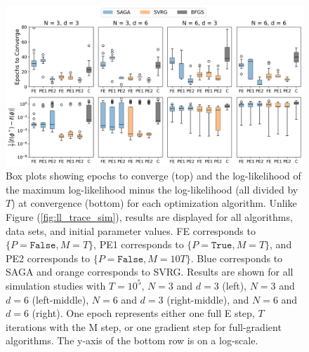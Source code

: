 %
\begin{figure}[h]
    \centering
    \includegraphics[width=6in]{../plt/boxplots_sim_T_100000.png}
    \caption{Box plots showing epochs to converge (top) and the log-likelihood of the maximum log-likelihood minus the log-likelihood (all divided by $T$) at convergence (bottom) for each optimization algorithm. Unlike Figure (\ref{fig:ll_trace_sim}), results are displayed for all algorithms, data sets, and initial parameter values. FE corresponds to $\{P = \texttt{False}, M = T\}$, PE1 corresponds to $\{P = \texttt{True}, M = T\}$, and PE2 corresponds to $\{P = \texttt{False}, M = 10T\}$. Blue corresponds to SAGA and orange corresponds to SVRG. Results are shown for all simulation studies with $T=10^{5}$, $N=3$ and $d=3$ (left), $N=3$ and $d=6$ (left-middle), $N=6$ and $d=3$ (right-middle), and $N=6$ and $d=6$ (right). One epoch represents either one full E step, $T$ iterations with the M step, or one gradient step for full-gradient algorithms. The y-axis of the bottom row is on a log-scale.}
    \label{fig:boxplots_sim}
\end{figure}
%
